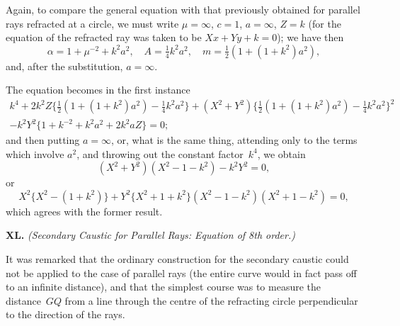 \documentclass[11pt,a4paper]{book}
\begin{document}
\begin{center}
Again, to compare the general equation with that previously
obtained for parallel rays refracted at a circle, we must write
$\mu = \infty$, $c = 1$, $a = \infty$, $Z = k$ (for the equation of the
refracted ray was taken to be $Xx + Yy + k = 0$); we have then
\[
\alpha = 1 + \mu^{-2} + k^{2}a^{2}, \quad
A = \tfrac{1}{4}k^{2}a^{2}, \quad
m = \tfrac{1}{2}(1 + (1 + k^{2})a^{2}),
\]
and, after the substitution, $a = \infty$.

The equation becomes in the first instance
\begin{multline*}
k^{4} + 2k^{2}Z \{ \tfrac{1}{2}(1 + (1 + k^{2})a^{2}) - \tfrac{1}{4}k^{2}a^{2} \}
+ (X^{2} + Y^{2}) \{ \tfrac{1}{2}(1 + (1 + k^{2})a^{2}) - \tfrac{1}{4}k^{2}a^{2} \}^{2} \\
- k^{2}Y^{2} \{ 1 + k^{-2} + k^{2}a^{2} + 2k^{2}aZ \} = 0;
\end{multline*}
and then putting $a = \infty$, or, what is the same thing, attending
only to the terms which involve $a^{2}$, and throwing out the constant
factor~$k^{4}$, we obtain
\[
(X^{2} + Y^{2})(X^{2} - 1 - k^{2}) - k^{2}Y^{2} = 0,
\]
or
\[
X^{2}\{X^{2} - (1 + k^{2})\} + Y^{2}\{X^{2} + 1 + k^{2}\}
(X^{2} - 1 - k^{2})(X^{2} + 1 - k^{2}) = 0,
\]
which agrees with the former result.

\medskip\noindent\textbf{XL.}
\textit{(Secondary Caustic for Parallel Rays: Equation of 8th order.)}

It was remarked that the ordinary construction for the secondary
caustic could not be applied to the case of parallel rays (the
entire curve would in fact pass off to an infinite distance),
and that the simplest course was to measure the distance~$GQ$
from a line through the centre of the refracting circle perpendicular
to the direction of the rays.


\end{center}
\end{document}
